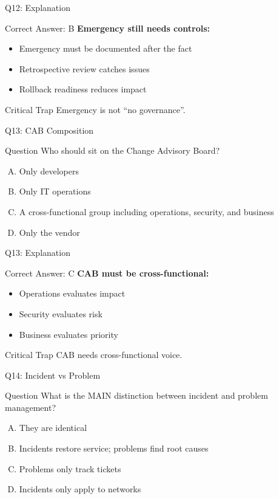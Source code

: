 \documentclass{beamer}
\begin{document}
	\begin{frame}{Q12: Explanation}
		\begin{block}{Correct Answer: B}
			\textbf{Emergency still needs controls:}
			\begin{itemize}
				\item Emergency must be documented after the fact
				\item Retrospective review catches issues
				\item Rollback readiness reduces impact
			\end{itemize}
		\end{block}
		\begin{alertblock}{Critical Trap}
			Emergency is not ``no governance''.
		\end{alertblock}
	\end{frame}
	
	\begin{frame}{Q13: CAB Composition}
		\begin{block}{Question}
			Who should sit on the Change Advisory Board?
		\end{block}
		\begin{enumerate}[(A)]
			\item Only developers
			\item Only IT operations
			\item A cross-functional group including operations, security, and business
			\item Only the vendor
		\end{enumerate}
	\end{frame}
	
	\begin{frame}{Q13: Explanation}
		\begin{block}{Correct Answer: C}
			\textbf{CAB must be cross-functional:}
			\begin{itemize}
				\item Operations evaluates impact
				\item Security evaluates risk
				\item Business evaluates priority
			\end{itemize}
		\end{block}
		\begin{alertblock}{Critical Trap}
			CAB needs cross-functional voice.
		\end{alertblock}
	\end{frame}
	
	\begin{frame}{Q14: Incident vs Problem}
		\begin{block}{Question}
			What is the MAIN distinction between incident and problem management?
		\end{block}
		\begin{enumerate}[(A)]
			\item They are identical
			\item Incidents restore service; problems find root causes
			\item Problems only track tickets
			\item Incidents only apply to networks
		\end{enumerate}
	\end{frame}
	
\end{document}
